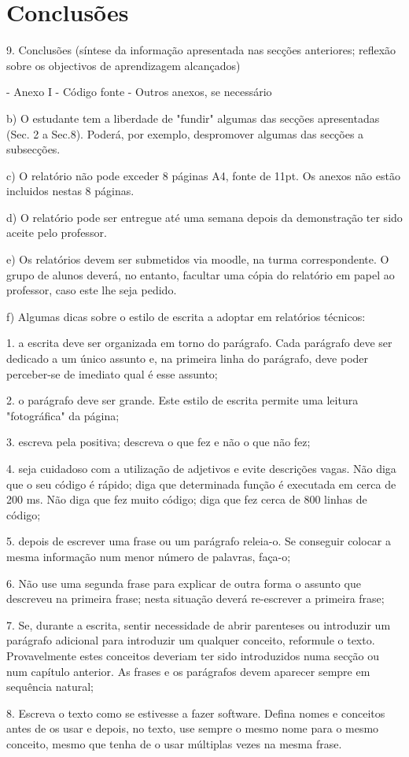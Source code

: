 \documentclass[article, a4paper, 11pt, oneside]{memoir}
\begin{document}
\chapter[Conclusões][Conclusões]{Conclusões} \label{\thechapter}

9. Conclusões
  (síntese da informação apresentada nas secções anteriores; reflexão sobre os objectivos de aprendizagem alcançados)

- Anexo I - Código fonte
- Outros anexos, se necessário


b) O estudante tem a liberdade de "fundir" algumas das secções apresentadas (Sec. 2 a Sec.8). Poderá, por exemplo, despromover algumas das secções a subsecções.


c) O relatório não pode exceder 8 páginas A4, fonte de 11pt. Os anexos não estão incluidos nestas 8 páginas.


d) O relatório pode ser entregue até uma semana depois da demonstração ter sido aceite pelo professor.


e) Os relatórios devem ser submetidos via moodle, na turma correspondente. O grupo de alunos deverá, no entanto, facultar uma cópia do relatório em papel ao professor, caso este lhe seja pedido.


f) Algumas dicas sobre o estilo de escrita a adoptar em relatórios técnicos:


1. a escrita deve ser organizada em torno do parágrafo.
  Cada parágrafo deve ser dedicado a um único assunto e,
  na primeira linha do parágrafo, deve poder perceber-se
  de imediato qual é esse assunto;

2. o parágrafo deve ser grande. Este estilo de escrita permite
  uma leitura "fotográfica" da página;

3. escreva pela positiva; descreva o que fez e não o que não fez;

4. seja cuidadoso com a utilização de adjetivos e evite
  descrições vagas.  Não diga que  o seu código é rápido; diga
  que determinada função é executada em cerca de 200 ms. Não diga
  que fez muito código; diga que fez cerca de 800 linhas de código;

5. depois de escrever uma frase ou um parágrafo releia-o. Se
  conseguir colocar a mesma informação num menor número de
  palavras, faça-o;

6. Não use uma segunda frase para explicar de outra forma o assunto
  que descreveu na primeira frase; nesta situação deverá re-escrever
  a primeira frase;

7. Se, durante a escrita, sentir necessidade de abrir parenteses ou
  introduzir um parágrafo adicional para introduzir um qualquer
  conceito, reformule o texto. Provavelmente estes conceitos deveriam
  ter sido introduzidos numa secção ou num capítulo anterior. As frases e
  os parágrafos devem aparecer sempre em sequência natural;

8. Escreva o texto como se estivesse a fazer software. Defina nomes
    e conceitos antes de os usar e depois, no texto, use sempre o mesmo nome
  para o mesmo conceito, mesmo que tenha de o usar múltiplas vezes na
  mesma frase.
  
\end{document}

